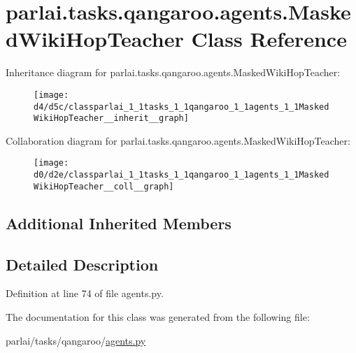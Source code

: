 \hypertarget{classparlai_1_1tasks_1_1qangaroo_1_1agents_1_1MaskedWikiHopTeacher}{}\section{parlai.\+tasks.\+qangaroo.\+agents.\+Masked\+Wiki\+Hop\+Teacher Class Reference}
\label{classparlai_1_1tasks_1_1qangaroo_1_1agents_1_1MaskedWikiHopTeacher}


Inheritance diagram for parlai.\+tasks.\+qangaroo.\+agents.\+Masked\+Wiki\+Hop\+Teacher\+:\nopagebreak
\begin{figure}[H]
\begin{center}
\leavevmode
\texttt{[image: d4/d5c/classparlai\_1\_1tasks\_1\_1qangaroo\_1\_1agents\_1\_1MaskedWikiHopTeacher\_\_inherit\_\_graph]}
\end{center}
\end{figure}


Collaboration diagram for parlai.\+tasks.\+qangaroo.\+agents.\+Masked\+Wiki\+Hop\+Teacher\+:\nopagebreak
\begin{figure}[H]
\begin{center}
\leavevmode
\texttt{[image: d0/d2e/classparlai\_1\_1tasks\_1\_1qangaroo\_1\_1agents\_1\_1MaskedWikiHopTeacher\_\_coll\_\_graph]}
\end{center}
\end{figure}
\subsection*{Additional Inherited Members}


\subsection{Detailed Description}


Definition at line 74 of file agents.\+py.



The documentation for this class was generated from the following file\+:\begin{DoxyCompactItemize}
\item 
parlai/tasks/qangaroo/\hyperlink{parlai_2tasks_2qangaroo_2agents_8py}{agents.\+py}\end{DoxyCompactItemize}
